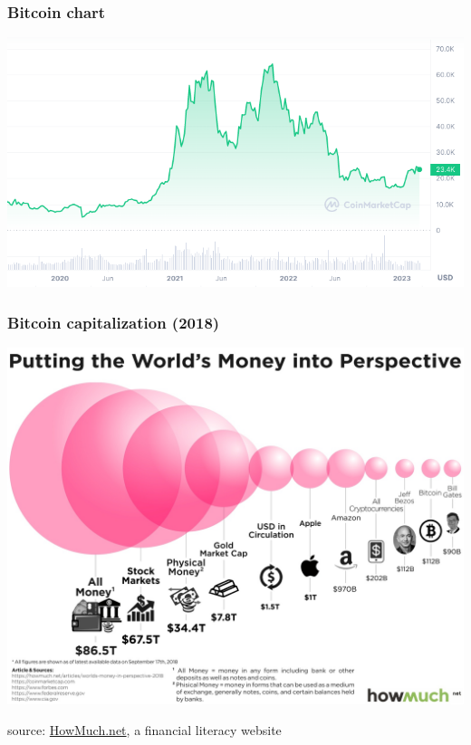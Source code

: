 \documentclass[11pt]{beamer}  %
\begin{document}
\begin{frame}\frametitle{Bitcoin chart}

  \begin{center}
    \includegraphics[width=\textwidth,clip=false]{pictures/bitcoin-coinmarketcap.png}
  \end{center}

\end{frame}

\begin{frame}\frametitle{Bitcoin capitalization (2018)}

  \begin{center}
    \includegraphics[scale=0.16,clip=false]{pictures/bitcoin-capitalization.jpg}
  \end{center}

  \begin{center}
    source: \url{HowMuch.net}, a financial literacy website
  \end{center}

\end{frame}
\end{document}
